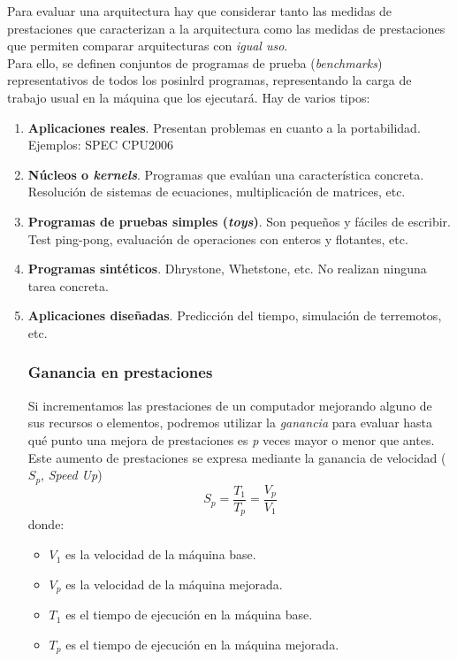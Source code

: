 \documentclass[12pt,spanish]{article}
\begin{document}
Para evaluar una arquitectura hay que considerar tanto las medidas de prestaciones que caracterizan a la arquitectura como las medidas de prestaciones que permiten comparar arquitecturas con \emph{igual uso}.\\
Para ello, se definen conjuntos de programas de prueba (\textit{benchmarks}) representativos de todos los posinlrd programas, representando la carga de trabajo usual en la máquina que los ejecutará. Hay de varios tipos:
\begin{enumerate}
\item \textbf{Aplicaciones reales}. Presentan problemas en cuanto a la portabilidad. Ejemplos: SPEC CPU2006
\item \textbf{Núcleos o \textit{kernels}}. Programas que evalúan una característica concreta. Resolución de sistemas de ecuaciones, multiplicación de matrices, etc.
\item \textbf{Programas de pruebas simples (\textit{toys})}. Son pequeños y fáciles de escribir. Test ping-pong, evaluación de operaciones con enteros y flotantes, etc.
\item \textbf{Programas sintéticos}. Dhrystone, Whetstone, etc. No realizan ninguna tarea concreta.
\item \textbf{Aplicaciones diseñadas}. Predicción del tiempo, simulación de terremotos, etc.
\subsubsection{Ganancia en prestaciones}
Si incrementamos las prestaciones de un computador mejorando alguno de sus recursos o elementos, podremos utilizar la \emph{ganancia} para evaluar hasta qué punto una mejora de prestaciones es \textit{p} veces mayor o menor que antes.\\
Este aumento de prestaciones se expresa mediante la ganancia de velocidad ($S_p$, \textit{Speed Up})
\begin{equation}
S_p=\frac{T_1}{T_p}=\frac{V_p}{V_1}
\end{equation}
donde:
\begin{itemize}
\item $V_1$ es la velocidad de la máquina base.
\item $V_p$ es la velocidad de la máquina mejorada.
\item $T_1$ es el tiempo de ejecución en la máquina base.
\item $T_p$ es el tiempo de ejecución en la máquina mejorada.
\end{itemize}
\end{enumerate}
\end{document}
